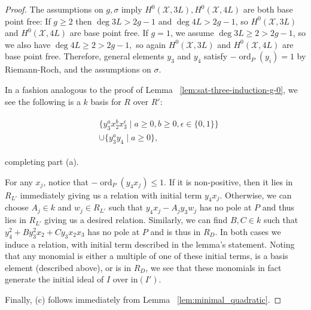 \documentclass{amsart}
\theoremstyle{plain}
\theoremstyle{definition}
\theoremstyle{remark}
\numberwithin{equation}{section}
\newcommand \sx{\mathscr X}
\DeclareMathOperator{\ord}{ord}
\newcommand \halfcan{L}
\newcommand \initial{\text{in}}
\begin{document}
\begin{proof}
The assumptions on $g,\sigma$ imply $H^0(\sx, 3L), H^0(\sx, 4L)$ are both base point free: If $g \geq 2$ then $\deg 3L > 2g-1$ and $\deg 4L > 2g-1$, so $H^0(\sx, 3L)$ and $H^0(\sx, 4L)$ are base point free. If $g = 1$, we assume $\deg 3L \geq 2 > 2g-1$, so we also have $\deg 4L \geq 2 > 2g -1,$ so again $H^0(\sx, 3L)$ and $H^0(\sx, 4L)$ are base point free. Therefore, general elements $y_3$ and $y_4$ satisfy $-\ord
_P(y_i) = 1$ by Riemann-Roch, and the assumptions on $\sigma$.  

In a fashion analogous to the proof of Lemma 
~\ref{lem:sat-three-induction-g-0}, we see 
the following is a $k$ basis for $R$ over $R'$:

\begin{align}
\label{eqn:sat_two_add_generator}
	\begin{split}
		&\{ y_3^ax_2^b x_3^\epsilon \mid a \geq 0, b 
		\geq 0, \epsilon \in \{0, 1\}\} \\
		&\cup \{ y_3^ay_4 \mid a \geq 0 \},
	\end{split}
\end{align}

\noindent
completing part (a).

For any $x_j$, notice that $-\ord_P(y_4x_j)\le 1$.  If it is non-positive, then it lies in $R_{\halfcan'}$ immediately giving us a relation with initial term $y_4x_j$.  Otherwise, 
we can choose $A_j \in k$ and $w_j\in R_{\halfcan'}$ such that $y_4x_j-A_jy_3w_j$ has no pole at $P$ and thus lies in $R_{\halfcan'}$ giving us a desired relation.  
Similarly, we can find $B, C \in k$ such that $y_4^2 + B y_3^2 x_2+ Cy_3x_2x_3$ has no pole at $P$ and is thus in $R_D$.  In both cases we induce a relation, with initial term described in the lemma's statement.  Noting that any monomial is either a multiple of one of these initial terms, is a basis element (described above), or is in $R_D$, we see that these monomials in fact generate the initial ideal of $I$ over $\initial(I')$.

Finally, (c) follows immediately from Lemma ~\ref{lem:minimal_quadratic}.
\end{proof}
\end{document}
